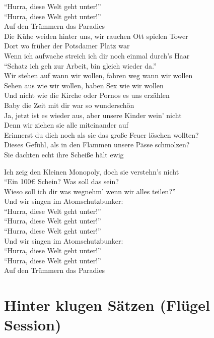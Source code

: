 \documentclass[]{book}
\begin{document}
``Hurra, diese Welt geht unter!''\\
``Hurra, diese Welt geht unter!''\\
Auf den Trümmern das Paradies\\
Die Kühe weiden hinter uns, wir rauchen Ott spielen Tower\\
Dort wo früher der Potsdamer Platz war\\
Wenn ich aufwache streich ich dir noch einmal durch's Haar\\
``Schatz ich geh zur Arbeit, bin gleich wieder da.''\\
Wir stehen auf wann wir wollen, fahren weg wann wir wollen\\
Sehen aus wie wir wollen, haben Sex wie wir wollen\\
Und nicht wie die Kirche oder Pornos es uns erzählen\\
Baby die Zeit mit dir war so wunderschön\\
Ja, jetzt ist es wieder aus, aber unsere Kinder wein' nicht\\
Denn wir ziehen sie alle miteinander auf\\
Erinnerst du dich noch als sie das große Feuer löschen wollten?\\
Dieses Gefühl, als in den Flammen unsere Pässe schmolzen?\\
Sie dachten echt ihre Scheiße hält ewig

Ich zeig den Kleinen Monopoly, doch sie verstehn's nicht\\
``Ein 100€ Schein? Was soll das sein?\\
Wieso soll ich dir was wegnehm' wenn wir alles teilen?''\\
Und wir singen im Atomschutzbunker:\\
``Hurra, diese Welt geht unter!''\\
``Hurra, diese Welt geht unter!''\\
``Hurra, diese Welt geht unter!''\\
Und wir singen im Atomschutzbunker:\\
``Hurra, diese Welt geht unter!''\\
``Hurra, diese Welt geht unter!''\\
Auf den Trümmern das Paradies

\hypertarget{hinter-klugen-satzen-flugel-session}{%
\section{Hinter klugen Sätzen (Flügel Session)}\label{hinter-klugen-satzen-flugel-session}}
\end{document}
